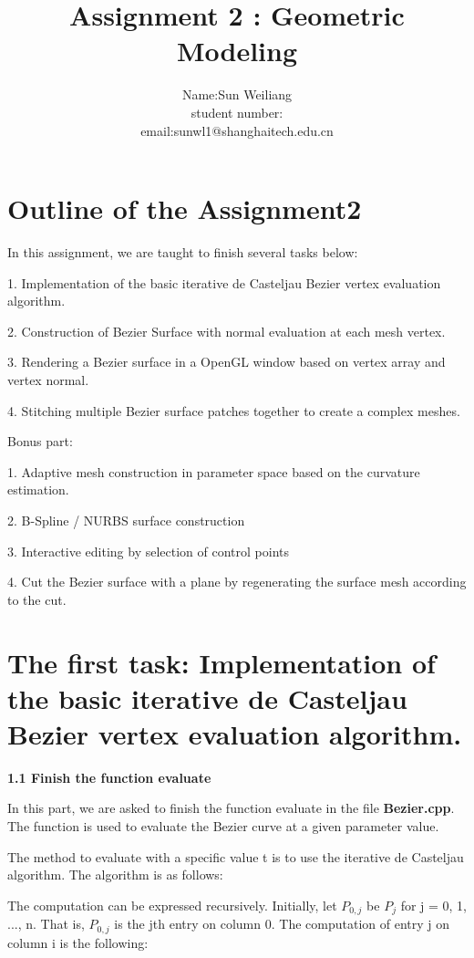 \documentclass[acmtog]{acmart}
\title{Assignment 2 : Geometric Modeling}
\author{Name:\quad Sun Weiliang  \\ student number:\quad 2020533010
	\\email:\quad sunwl1@shanghaitech.edu.cn}
\begin{document}
\maketitle

\vspace*{2 ex}

\section{Outline of the Assignment2}

In this assignment, we are taught to finish several tasks below:

1. Implementation of the basic iterative de Casteljau Bezier vertex evaluation algorithm.

2. Construction of  Bezier Surface with normal evaluation at each mesh vertex.

3. Rendering a Bezier surface in a OpenGL window based on vertex array and vertex normal.

4. Stitching multiple Bezier surface patches together to create a complex meshes.

Bonus part:

1. Adaptive mesh construction in parameter space based on the curvature estimation.

2. B-Spline / NURBS surface construction

3. Interactive editing by selection of control points

4. Cut the Bezier surface with a plane by regenerating the surface mesh according to the cut.

\section{The first task: Implementation of the basic iterative de Casteljau Bezier vertex evaluation algorithm.}

\textbf{1.1 Finish the function evaluate}

In this part, we are asked to finish the function evaluate in the file \textbf{Bezier.cpp}. The function is used to evaluate the Bezier curve at a given parameter value. 

The method to evaluate with a specific value t is to use the iterative de Casteljau algorithm. The algorithm is as follows:

The computation can be expressed recursively. Initially, let $P_{0,j}$ be $P_j$ for j = 0, 1, ..., n. That is, $P_{0,j}$ is the jth entry on column 0. The computation of entry j on column i is the following: 
\end{document}
